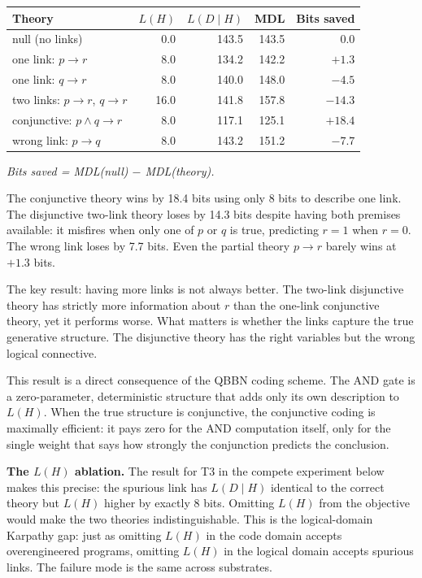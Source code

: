 \begin{center}
\begin{tabular}{lrrrr}
\toprule
Theory & $L(H)$ & $L(D \mid H)$ & MDL & Bits saved \\
\midrule
null (no links)                 &  0.0 & 143.5 & 143.5 &      $0.0$ \\
one link: $p \to r$             &  8.0 & 134.2 & 142.2 &     $+1.3$ \\
one link: $q \to r$             &  8.0 & 140.0 & 148.0 &     $-4.5$ \\
two links: $p \to r$, $q \to r$ & 16.0 & 141.8 & 157.8 &    $-14.3$ \\
conjunctive: $p \wedge q \to r$ &  8.0 & 117.1 & 125.1 & $+\mathbf{18.4}$ \\
wrong link: $p \to q$           &  8.0 & 143.2 & 151.2 &     $-7.7$ \\
\bottomrule
\end{tabular}
\end{center}

\textit{Bits saved = MDL(null) $-$ MDL(theory).}

The conjunctive theory wins by 18.4 bits using only 8 bits to describe
one link. The disjunctive two-link theory loses by 14.3 bits despite
having both premises available: it misfires when only one of $p$ or
$q$ is true, predicting $r = 1$ when $r = 0$. The wrong link loses by
7.7 bits. Even the partial theory $p \to r$ barely wins at $+1.3$ bits.

The key result: having more links is not always better. The two-link
disjunctive theory has strictly more information about $r$ than the
one-link conjunctive theory, yet it performs worse. What matters is
whether the links capture the true generative structure. The
disjunctive theory has the right variables but the wrong logical
connective.

This result is a direct consequence of the QBBN coding scheme. The
AND gate is a zero-parameter, deterministic structure that adds only
its own description to $L(H)$. When the true structure is conjunctive,
the conjunctive coding is maximally efficient: it pays zero for the
AND computation itself, only for the single weight that says how
strongly the conjunction predicts the conclusion.

\textbf{The $L(H)$ ablation.} The result for T3 in the compete
experiment below makes this precise: the spurious link has $L(D \mid H)$
identical to the correct theory but $L(H)$ higher by exactly 8 bits.
Omitting $L(H)$ from the objective would make the two theories
indistinguishable. This is the logical-domain Karpathy gap: just as
omitting $L(H)$ in the code domain accepts overengineered programs,
omitting $L(H)$ in the logical domain accepts spurious links. The
failure mode is the same across substrates.

